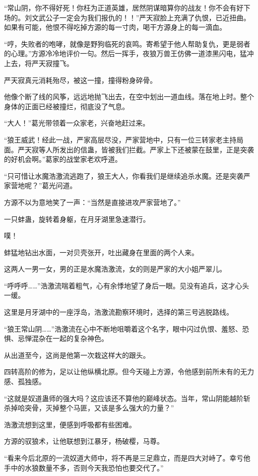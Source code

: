 \begin{this_body}
“常山阴，你不得好死！你枉为正道英雄，居然阴谋暗算你的战友！你不会有好下场的。刘文武公子一定会为我们报仇的！！”严天寂脸上充满了仇恨，已近扭曲。如果有可能，他恨不得吃掉方源的每一寸肉，喝干方源身上的每一滴血。

“哼，失败者的咆哮，就像是野狗临死的哀鸣。寄希望于他人帮助复仇，更是弱者的心理。”方源冷冷地评价一句。然后一挥手，夜狼万兽王仿佛一道漆黑闪电，猛冲上去，将严天寂撞飞。

严天寂真元消耗殆尽，被这一撞，撞得粉身碎骨。

他像个断了线的风筝，远远地抛飞出去，在空中划出一道血线。落在地上时。整个身体的正面已经被撞烂，彻底没了气息。

“大人！”葛光带领着一众家老，兴奋地赶过来。

“狼王威武！经此一战，严家高层尽没，严家营地中，只有一位三转家老主持局面。严天寂等人所发出的信蛊，皆被我们拦截。严家上下还被蒙在鼓里，正是突袭的好机会啊。”葛家的战堂家老欢呼道。

“只可惜让水魔浩激流逃跑了，狼王大人，你看我们是继续追杀水魔。还是突袭严家营地呢？”葛光问道。

方源不以为意地笑了一声：“当然是直接进攻严家营地了。”

一只蚌蛊，旋转着身躯，在月牙湖里急速潜行。

噗！

蚌猛地钻出水面，一对贝壳张开，吐出藏身在里面的两个人来。

这两人一男一女，男的正是水魔浩激流，女的则是严家的大小姐严翠儿。

“呼呼呼……”浩激流喘着粗气，心有余悸地望了身后一眼。见没有追兵，这才心头一缓。

这里是月牙湖中的一座浮岛，浩激流勘察环境时，选择的第三号逃脱路线。

“狼王常山阴……”浩激流在心中不断地咀嚼着这个名字，眼中闪过仇恨、羞怒、恐惧、忌惮混杂在一起的复杂神色。

从出道至今，这尚是他第一次栽这样大的跟头。

四转高阶的修为，足以让他纵横北原。但今天碰上方源，令他感到前所未有的无力感、孤独感。

“这就是奴道蛊师的强大吗？这应该还不算他的巅峰状态。当年，常山阴能越阶斩杀掉哈突骨，灭掉整个马匪，又该是多么强大的力量？”

浩激流想到这里，便感到呼吸都有些困难。

方源的驭狼术，让他联想到江暴牙，杨破樱，马尊。

“看来今后北原的一流奴道大师中，将不再是三足鼎立，而是四大对峙了。幸亏他手中的水狼数量不多，否则今天我恐怕也要交代了。”


\end{this_body}
